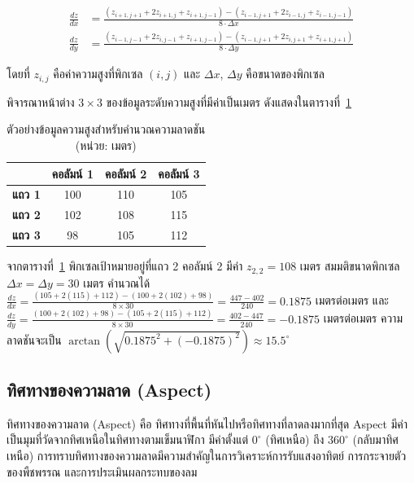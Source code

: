 \[
\begin{aligned}
\frac{dz}{dx} &= \frac{(z_{i+1,j+1} + 2z_{i+1,j} + z_{i+1,j-1}) - (z_{i-1,j+1} + 2z_{i-1,j} + z_{i-1,j-1})}{8 \cdot \Delta x} \\
\frac{dz}{dy} &= \frac{(z_{i-1,j-1} + 2z_{i,j-1} + z_{i+1,j-1}) - (z_{i-1,j+1} + 2z_{i,j+1} + z_{i+1,j+1})}{8 \cdot \Delta y}
\end{aligned}
\]

โดยที่ $z_{i,j}$ คือค่าความสูงที่พิกเซล $(i,j)$ และ $\Delta x$, $\Delta y$ คือขนาดของพิกเซล

\begin{ex}
พิจารณาหน้าต่าง $3 \times 3$ ของข้อมูลระดับความสูงที่มีค่าเป็นเมตร ดังแสดงในตารางที่~\ref{tab:slope-calc}

\begin{table}[ht]
\centering
\caption{ตัวอย่างข้อมูลความสูงสำหรับคำนวณความลาดชัน (หน่วย: เมตร)}
\label{tab:slope-calc}
\begin{tabular}{|c|c|c|c|}
\hline
 & \textbf{คอลัมน์ 1} & \textbf{คอลัมน์ 2} & \textbf{คอลัมน์ 3} \\ \hline
\textbf{แถว 1} & 100 & 110 & 105 \\ \hline
\textbf{แถว 2} & 102 & 108 & 115 \\ \hline
\textbf{แถว 3} & 98  & 105 & 112 \\ \hline
\end{tabular}
\end{table}

จากตารางที่~\ref{tab:slope-calc} พิกเซลเป้าหมายอยู่ที่แถว 2 คอลัมน์ 2 มีค่า $z_{2,2} = 108$ เมตร สมมติขนาดพิกเซล $\Delta x = \Delta y = 30$ เมตร คำนวณได้ $\frac{dz}{dx} = \frac{(105 + 2(115) + 112) - (100 + 2(102) + 98)}{8 \times 30} = \frac{447 - 402}{240} = 0.1875$ เมตรต่อเมตร และ $\frac{dz}{dy} = \frac{(100 + 2(102) + 98) - (105 + 2(115) + 112)}{8 \times 30} = \frac{402 - 447}{240} = -0.1875$ เมตรต่อเมตร ความลาดชันจะเป็น $\arctan(\sqrt{0.1875^2 + (-0.1875)^2}) \approx 15.5^\circ$
\end{ex}

\subsection{ทิศทางของความลาด (Aspect)}

ทิศทางของความลาด (Aspect) คือ ทิศทางที่พื้นที่หันไปหรือทิศทางที่ลาดลงมากที่สุด Aspect มีค่าเป็นมุมที่วัดจากทิศเหนือในทิศทางตามเข็มนาฬิกา มีค่าตั้งแต่ $0^\circ$ (ทิศเหนือ) ถึง $360^\circ$ (กลับมาทิศเหนือ) การทราบทิศทางของความลาดมีความสำคัญในการวิเคราะห์การรับแสงอาทิตย์ การกระจายตัวของพืชพรรณ และการประเมินผลกระทบของลม

